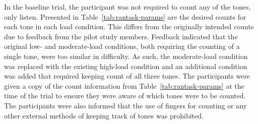 \documentclass[11pt]{article}
\begin{document}
	\begin{table}[]
	\centering
	\caption[RanTask Load Condition Tone Counts]{RanTask Desired Tone Counts}
	
	
	\label{tab:rantask-params}
	\end{table}
	
	In the baseline trial, the participant was not required to count any of the tones, only listen. Presented in Table~\ref{tab:rantask-params} are the desired counts for each tone in each load condition. This differs from the originally intended counts due to feedback from the pilot study members. Feedback indicated that the original low- and moderate-load conditions, both requiring the counting of a single tone, were too similar in difficulty. As such, the moderate-load condition was replaced with the existing high-load condition and an additional condition was added that required keeping count of all three tones. The participants were given a copy of the count information from Table~\ref{tab:rantask-params} at the time of the trial to ensure they were aware of which tones were to be counted. The participants were also informed that the use of fingers for counting or any other external methods of keeping track of tones was prohibited.
	
\end{document}
